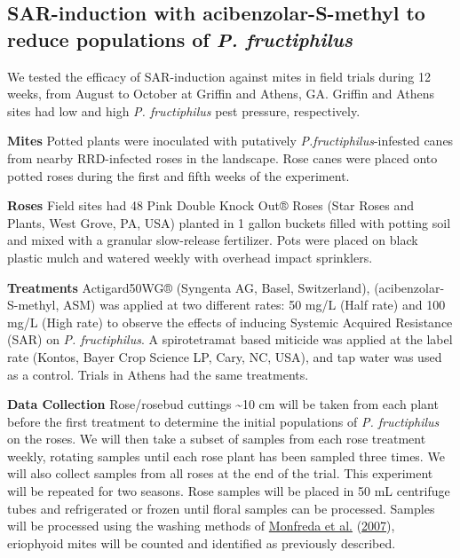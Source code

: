 \documentclass[12pt,final,CPage]{ufthesis}
\begin{document}
{  \hypertarget{ipm-actigard}{%
  \subsection{\texorpdfstring{SAR-induction with acibenzolar-S-methyl to reduce populations of \emph{P. fructiphilus}}{SAR-induction with acibenzolar-S-methyl to reduce populations of P. fructiphilus}}\label{ipm-actigard}}

  We tested the efficacy of SAR-induction against mites in field trials during 12 weeks, from August to October at Griffin and Athens, GA. Griffin and Athens sites had low and high \emph{P. fructiphilus} pest pressure, respectively.

  \textbf{Mites}
  Potted plants were inoculated with putatively \emph{P.fructiphilus}-infested canes from nearby RRD-infected roses in the landscape. Rose canes were placed onto potted roses during the first and fifth weeks of the experiment.

  \textbf{Roses}
  Field sites had 48 Pink Double Knock Out® Roses (Star Roses and Plants, West Grove, PA, USA) planted in 1 gallon buckets filled with potting soil and mixed with a granular slow-release fertilizer. Pots were placed on black plastic mulch and watered weekly with overhead impact sprinklers.

  \textbf{Treatments}
  Actigard50WG® (Syngenta AG, Basel, Switzerland), (acibenzolar-S-methyl, ASM) was applied at two different rates: 50 \si{\milli\gram}/\si{\liter} (Half rate) and 100 \si{\milli\gram}/\si{\liter} (High rate) to observe the effects of inducing Systemic Acquired Resistance (SAR) on \emph{P. fructiphilus}. A spirotetramat based miticide was applied at the label rate (Kontos, Bayer Crop Science LP, Cary, NC, USA), and tap water was used as a control. Trials in Athens had the same treatments.

  \textbf{Data Collection}
  Rose/rosebud cuttings \textasciitilde10 cm will be taken from each plant before the first treatment to determine the initial populations of \emph{P. fructiphilus} on the roses. We will then take a subset of samples from each rose treatment weekly, rotating samples until each rose plant has been sampled three times. We will also collect samples from all roses at the end of the trial. This experiment will be repeated for two seasons. Rose samples will be placed in 50 mL centrifuge tubes and refrigerated or frozen until floral samples can be processed. Samples will be processed using the washing methods of \protect\hyperlink{ref-Monfreda2007}{Monfreda et al.} (\protect\hyperlink{ref-Monfreda2007}{2007}), eriophyoid mites will be counted and identified as previously described.

}
\end{document}
